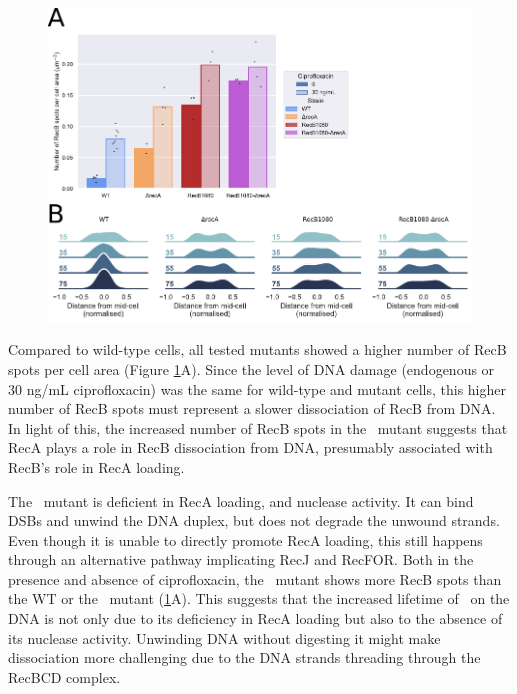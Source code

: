 \begin{figure}[htbp]
\begin{center}
\includegraphics[width=\textwidth]{Figures/Fig5_mutants.pdf}
\end{center}
\caption{}
\label{Fig:mutants}
\end{figure}

Compared to wild-type cells, all tested mutants showed a higher number of RecB spots per cell area (Figure \ref{Fig:mutants}A). Since the level of DNA damage (endogenous or 30 ng/mL ciprofloxacin) was the same for wild-type and mutant cells, this higher number of RecB spots must represent a slower dissociation of RecB from DNA. In light of this, the increased number of RecB spots in the \dreca\ mutant suggests that RecA plays a role in RecB dissociation from DNA, presumably associated with RecB's role in RecA loading.

The \teneighty\ mutant is deficient in RecA loading, and nuclease activity.\cite{} It can bind DSBs and unwind the DNA duplex, but does not degrade the unwound strands. Even though it is unable to directly promote RecA loading, this still happens through an alternative pathway implicating RecJ and RecFOR.\cite{} Both in the presence and absence of ciprofloxacin, the \teneighty\ mutant shows more RecB spots than the WT or the \dreca\ mutant (\ref{Fig:mutants}A). This suggests that the increased lifetime of \teneighty\ on the DNA is not only due to its deficiency in RecA loading but also to the absence of its nuclease activity. Unwinding DNA without digesting it might make dissociation more challenging due to the DNA strands threading through the RecBCD complex.

